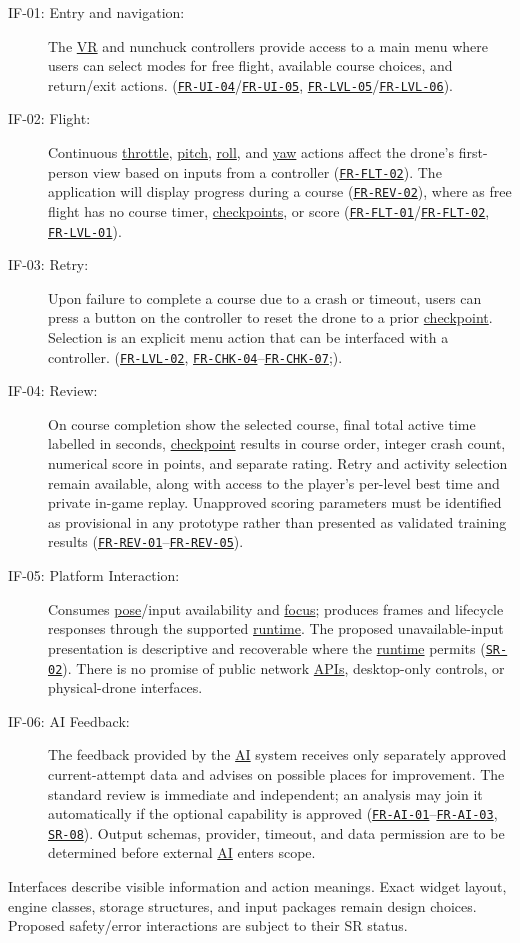 \documentclass[12pt]{article}
\newcommand{\req}[1]{\hyperlink{req:#1}{\texttt{#1}}}
\begin{document}
\begin{description}
\item[IF-01: Entry and navigation:] The \hyperlink{glos:VR}{VR} and nunchuck controllers provide access to a main menu where
users can select modes for free flight, available course choices, and return/exit actions. (\req{FR-UI-04}/\req{FR-UI-05},
\req{FR-LVL-05}/\req{FR-LVL-06}).
\item[IF-02: Flight:] Continuous \hyperlink{glos:Throttle}{throttle}, \hyperlink{glos:Throttle}{pitch}, \hyperlink{glos:Throttle}{roll}, and \hyperlink{glos:Throttle}{yaw} actions affect
the drone's first-person view based on inputs from a controller (\req{FR-FLT-02}). The application will display progress during
a course (\req{FR-REV-02}), where as free flight has no course timer, \hyperlink{glos:Checkpoint}{checkpoints}, or score
(\req{FR-FLT-01}/\req{FR-FLT-02}, \req{FR-LVL-01}).
\item[IF-03: Retry:] Upon failure to complete a course due to a crash or timeout, users can press a button on the controller to reset the drone to a prior \hyperlink{glos:Checkpoint}{checkpoint}.
Selection is an explicit menu action that can be interfaced with a controller.
(\req{FR-LVL-02}, \req{FR-CHK-04}--\req{FR-CHK-07};).
\item[IF-04: Review:] On course completion show the selected course, final total
active time labelled in seconds, \hyperlink{glos:Checkpoint}{checkpoint} results in course order, integer
crash count, numerical score in points, and separate rating. Retry and activity
selection remain available, along with access to the player's per-level best
time and private in-game replay. Unapproved
scoring parameters must be identified as provisional in any prototype rather
than presented as validated training results (\req{FR-REV-01}--\req{FR-REV-05}).
\item[IF-05: Platform Interaction:] Consumes \hyperlink{glos:Tracking}{pose}/input availability and \hyperlink{glos:Focus}{focus};
produces frames and lifecycle responses through the supported \hyperlink{glos:Runtime}{runtime}. The
proposed unavailable-input presentation is descriptive and recoverable where
the \hyperlink{glos:Runtime}{runtime} permits (\req{SR-02}). There is no promise of public
\hypertarget{gl:API}{}network \hyperlink{glos:API}{APIs}, desktop-only controls, or physical-drone interfaces.
\item[IF-06: AI Feedback:] The feedback provided by the \hyperlink{glos:AI}{AI} system receives only separately approved
current-attempt data and advises on possible places for improvement. The
standard review is immediate and independent; an analysis may join it
automatically if the optional capability is approved
(\req{FR-AI-01}--\req{FR-AI-03}, \req{SR-08}). Output schemas,
provider, timeout, and data permission are to be determined before external
\hyperlink{glos:AI}{AI} enters scope.
\end{description}
Interfaces describe visible information and action meanings. Exact widget
layout, engine classes, storage structures, and input packages remain design
choices. Proposed safety/error interactions are subject to their SR status.
\end{document}
